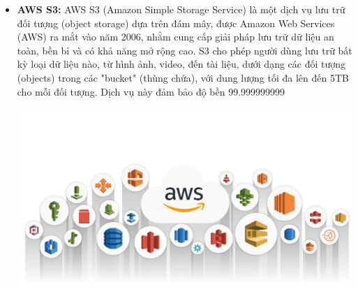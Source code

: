 \begin{itemize}
    \item \textbf{AWS S3:} AWS S3 (Amazon Simple Storage Service) là một dịch vụ lưu trữ đối tượng (object storage) dựa trên đám mây, được Amazon Web Services (AWS) ra mắt vào năm 2006, nhằm cung cấp giải pháp lưu trữ dữ liệu an toàn, bền bỉ và có khả năng mở rộng cao. S3 cho phép người dùng lưu trữ bất kỳ loại dữ liệu nào, từ hình ảnh, video, đến tài liệu, dưới dạng các đối tượng (objects) trong các "bucket" (thùng chứa), với dung lượng tối đa lên đến 5TB cho mỗi đối tượng. Dịch vụ này đảm bảo độ bền 99.999999999%

    \includegraphics[width=\textwidth]{img/aws.png}
\end{itemize}

